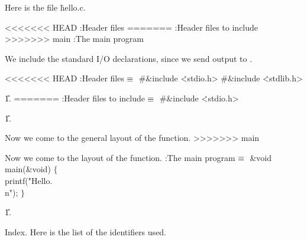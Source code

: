 


Here is the file \.{hello.c}.

<<<<<<< HEAD
\Y\B{}:Header files\X\6
=======
\Y\B{}:Header files to include\X\6
>>>>>>> main
:The main program\X\par
\fi

We include the standard I/O declarations, since we send output to .

<<<<<<< HEAD
\Y\B\4:Header files\X${}\equiv{}$\6
\8\#\&{include} \.{<stdio.h>}\6
\8\#\&{include} \.{<stdlib.h>}\par
\U1.\fi
=======
\Y\B\4:Header files to include\X${}\equiv{}$\6
\8\#\&{include} \.{<stdio.h>}\par
\U1.\fi

Now we come to the general layout of the  function.
>>>>>>> main

Now we come to the layout of the  function.
\Y\B\4:The main program\X${}\equiv{}$\6
\1\1\&{void} \\{main}(\&{void})\2\2\6
${}\{{}$\1\6
\\{printf}(\.{"Hello.\\n"});\6
\4${}\}{}$\2\par
\U1.\fi

Index.
Here is the list of the identifiers used.
\fi

\inx
\fin
\con
